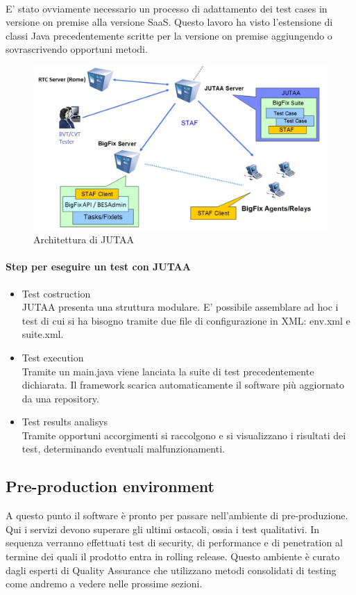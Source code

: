 \paragraph{}
E' stato ovviamente necessario un processo di adattamento dei test cases in versione on premise alla versione SaaS. Questo lavoro ha visto l'estensione di classi Java precedentemente scritte per la versione on premise aggiungendo o sovrascrivendo opportuni metodi. 
\begin{figure}[h]
	\centering
	\includegraphics[width=0.7\linewidth]{capitoli/imgs/jutaaarchitecture}
	\caption{Architettura di JUTAA}
	\label{fig:jutaaarchitecture}
\end{figure}
\paragraph{Step per eseguire un test con JUTAA}
\begin{itemize}
	\item Test costruction \\
	JUTAA presenta una struttura modulare. E' possibile assemblare ad hoc i test di cui si ha bisogno tramite due file di configurazione in XML: env.xml e suite.xml. 
	\item Test execution\\
	Tramite un main.java viene lanciata la suite di test precedentemente dichiarata. Il framework scarica automaticamente il software più aggiornato da una repository.
	\item Test results analisys \\
	Tramite opportuni accorgimenti si raccolgono e si visualizzano i risultati dei test, determinando eventuali malfunzionamenti.
\end{itemize}
\subsection{Pre-production environment}
A questo punto il software è pronto per passare nell'ambiente di pre-produzione. Qui i servizi devono superare gli ultimi ostacoli, ossia i test qualitativi. In sequenza verranno effettuati test di security, di performance e di penetration al termine dei quali il prodotto entra in rolling release. Questo ambiente è curato dagli esperti di Quality Assurance che utilizzano metodi consolidati di testing come andremo a vedere nelle prossime sezioni.
